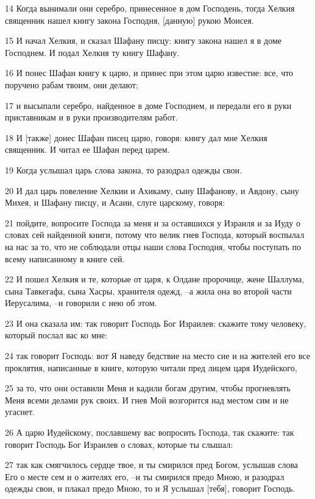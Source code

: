 \par 14 Когда вынимали они серебро, принесенное в дом Господень, тогда Хелкия священник нашел книгу закона Господня, [данную] рукою Моисея.
\par 15 И начал Хелкия, и сказал Шафану писцу: книгу закона нашел я в доме Господнем. И подал Хелкия ту книгу Шафану.
\par 16 И понес Шафан книгу к царю, и принес при этом царю известие: все, что поручено рабам твоим, они делают;
\par 17 и высыпали серебро, найденное в доме Господнем, и передали его в руки приставникам и в руки производителям работ.
\par 18 И [также] донес Шафан писец царю, говоря: книгу дал мне Хелкия священник. И читал ее Шафан перед царем.
\par 19 Когда услышал царь слова закона, то разодрал одежды свои.
\par 20 И дал царь повеление Хелкии и Ахикаму, сыну Шафанову, и Авдону, сыну Михея, и Шафану писцу, и Асаии, слуге царскому, говоря:
\par 21 пойдите, вопросите Господа за меня и за оставшихся у Израиля и за Иуду о словах сей найденной книги, потому что велик гнев Господа, который воспылал на нас за то, что не соблюдали отцы наши слова Господня, чтобы поступать по всему написанному в книге сей.
\par 22 И пошел Хелкия и те, которые от царя, к Олдане пророчице, жене Шаллума, сына Тавкегафа, сына Хасры, хранителя одежд, --а жила она во второй части Иерусалима, --и говорили с нею об этом.
\par 23 И она сказала им: так говорит Господь Бог Израилев: скажите тому человеку, который послал вас ко мне:
\par 24 так говорит Господь: вот Я наведу бедствие на место сие и на жителей его все проклятия, написанные в книге, которую читали пред лицем царя Иудейского,
\par 25 за то, что они оставили Меня и кадили богам другим, чтобы прогневлять Меня всеми делами рук своих. И гнев Мой возгорится над местом сим и не угаснет.
\par 26 А царю Иудейскому, пославшему вас вопросить Господа, так скажите: так говорит Господь Бог Израилев о словах, которые ты слышал:
\par 27 так как смягчилось сердце твое, и ты смирился пред Богом, услышав слова Его о месте сем и о жителях его, --и ты смирился предо Мною, и разодрал одежды свои, и плакал предо Мною, то и Я услышал [тебя], говорит Господь.
